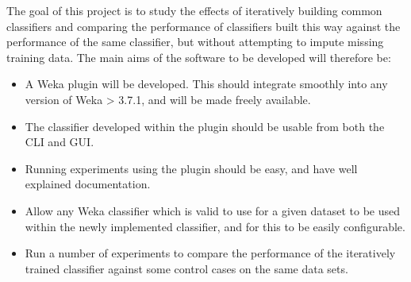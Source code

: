 
The goal of this project is to study the effects of iteratively building common classifiers and comparing the performance of classifiers built this way against the performance of the same classifier, but without attempting to impute missing training data. The main aims of the software to be developed will therefore be:

\begin{itemize}
\item A Weka plugin will be developed. This should integrate smoothly into any version of Weka > 3.7.1, and will be made freely available.
\item The classifier developed within the plugin should be usable from both the CLI and GUI.
\item Running experiments using the plugin should be easy, and have well explained documentation.
\item Allow any Weka classifier which is valid to use for a given dataset to be used within the newly implemented classifier, and for this to be easily configurable.
\item Run a number of experiments to compare the performance of the iteratively trained classifier against some control cases on the same data sets.
\end{itemize}
